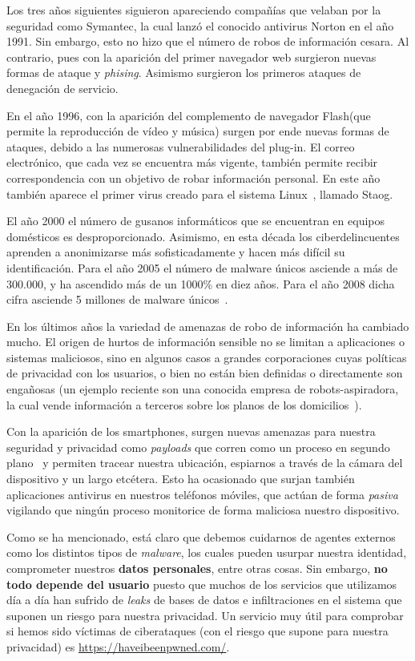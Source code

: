 Los tres años siguientes siguieron apareciendo compañías que velaban por la seguridad como Symantec, la cual lanzó el conocido antivirus Norton en el año 1991.
Sin embargo, esto no hizo que el número de robos de información cesara. Al contrario, pues con la aparición del primer navegador web surgieron nuevas formas de ataque y \textit{phising}. Asimismo surgieron los primeros ataques de denegación de servicio.

En el año 1996, con la aparición del complemento de navegador Flash(que permite la reproducción de vídeo y música) surgen por ende nuevas formas de ataques, debido a las numerosas vulnerabilidades del plug-in. El correo electrónico, que cada vez se encuentra más vigente, también permite recibir correspondencia con un objetivo de robar información personal. En este año también aparece el primer virus creado para el sistema Linux~\cite{article:staog}, llamado Staog.

El año 2000 el número de gusanos informáticos que se encuentran en equipos domésticos es desproporcionado. Asimismo, en esta década los ciberdelincuentes aprenden a anonimizarse más sofisticadamente y hacen más difícil su identificación.
Para el año 2005 el número de malware únicos asciende a más de 300.000, y ha ascendido más de un 1000\% en diez años. Para el año 2008 dicha cifra asciende 5 millones de malware únicos~\cite{article:number_malware}.

En los últimos años la variedad de amenazas de robo de información ha cambiado mucho. El origen de hurtos de información sensible no se limitan a aplicaciones o sistemas maliciosos, sino en algunos casos a grandes corporaciones cuyas políticas de privacidad con los usuarios, o bien no están bien definidas o directamente son engañosas (un ejemplo reciente son una conocida empresa de robots-aspiradora, la cual vende información a terceros sobre los planos de los domicilios~\cite{article:roomba}). 

Con la aparición de los smartphones, surgen nuevas amenazas para nuestra seguridad y privacidad como \textit{payloads} que corren como un proceso en segundo plano~\cite{article:android} y permiten tracear nuestra ubicación, espiarnos a través de la cámara del dispositivo y un largo etcétera. Esto ha ocasionado que surjan también aplicaciones antivirus en nuestros teléfonos móviles, que actúan de forma \textit{pasiva} vigilando que ningún proceso monitorice de forma maliciosa nuestro dispositivo. 

Como se ha mencionado, está claro que debemos cuidarnos de agentes externos como los distintos tipos de \textit{malware}, los cuales pueden usurpar nuestra identidad, comprometer nuestros \textbf{datos personales}, entre otras cosas. 
Sin embargo, \textbf{no todo depende del usuario }puesto que muchos de los servicios que utilizamos día a día han sufrido de \textit{leaks} de bases de datos e infiltraciones en el sistema que suponen un riesgo para nuestra privacidad. Un servicio muy útil para comprobar si hemos sido víctimas de ciberataques (con el riesgo que supone para nuestra privacidad) es \url{https://haveibeenpwned.com/}.

